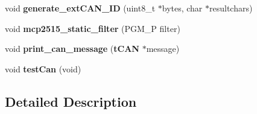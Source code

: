 \begin{DoxyCompactItemize}
\item 
void {\bfseries generate\-\_\-ext\-C\-A\-N\-\_\-\-I\-D} (uint8\-\_\-t $\ast$bytes, char $\ast$resultchars)\label{group__can_ga2a5c69391db363ee151e2e700becc044}

\item 
void {\bfseries mcp2515\-\_\-static\-\_\-filter} (\-P\-G\-M\-\_\-\-P filter)\label{group__can_ga71ab0da5b7baa0e05ab444f76dd776c2}

\item 
void {\bfseries print\-\_\-can\-\_\-message} ({\bf t\-C\-A\-N} $\ast$message)\label{group__can_ga52abe12031912f44f79fe7e6af042d1b}

\item 
void {\bfseries test\-Can} (void)\label{group__can_gaff8c7fc3028fe24b6a3dfc003054d3eb}

\end{DoxyCompactItemize}


\subsection{\-Detailed \-Description}
